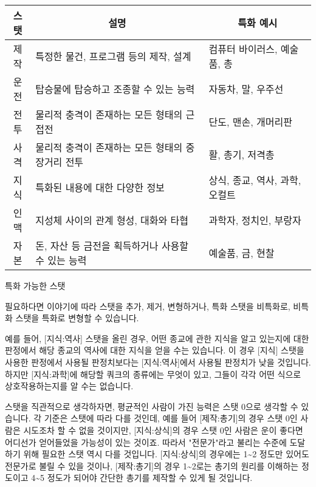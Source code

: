 \documentclass{report}
\begin{document}
	\begin{minipage}{\textwidth}
		\begin{tabularx}{\textwidth}{c|X|l}
			\hline
			\textbf{스탯} & \multicolumn{1}{c|}{\textbf{설명}} & \multicolumn{1}{c}{\textbf{특화 예시}} \\ \hline \hline
			제작          & 특정한 물건, 프로그램 등의 제작, 설계          & 컴퓨터 바이러스, 예술품, 총          \\\hline
			운전          & 탑승물에 탑승하고 조종할 수 있는 능력           & 자동차, 말, 우주선         \\\hline
			전투          & 물리적 충격이 존재하는 모든 형태의 근접전         & 단도, 맨손, 개머리판         \\\hline
			사격          & 물리적 충격이 존재하는 모든 형태의 중장거리 전투     & 활, 총기, 저격총         \\\hline
			지식          & 특화된 내용에 대한 다양한 정보               & 상식, 종교, 역사, 과학, 오컬트         \\\hline
			인맥          & 지성체 사이의 관계 형성, 대화와 타협           & 과학자, 정치인, 부랑자         \\\hline
			자본          & 돈, 자산 등 금전을 획득하거나 사용할 수 있는 능력   & 예술품, 금, 현찰  \\\hline
		\end{tabularx}
		
		\begin{center}
			특화 가능한 스탯
		\end{center}
	\end{minipage}
	
	\bigskip
	
	필요하다면 이야기에 따라 스탯을 추가, 제거, 변형하거나, 특화 스탯을 비특화로, 비특화 스탯을 특화로 변형할 수 있습니다.
	
	\bigskip
	
	예를 들어, [지식:역사] 스탯을 올린 경우, 어떤 종교에 관한 지식을 알고 있는지에 대한 판정에서 해당 종교의 역사에 대한 지식을 얻을 수는 있습니다. 이 경우 [지식] 스탯을 사용한 판정에서 사용될 판정치보다는 [지식:역사]에서 사용될 판정치가 낮을 것입니다. 하지만 [지식:과학]에 해당할 쿼크의 종류에는 무엇이 있고, 그들이 각각 어떤 식으로 상호작용하는지를 알 수는 없습니다.
	
	\bigskip
	
	스탯을 직관적으로 생각하자면, 평균적인 사람이 가진 능력은 스탯 0으로 생각할 수 있습니다. 각 기준은 스탯에 따라 다를 것인데, 예를 들어 [제작:총기]의 경우 스탯 0인 사람은 시도조차 할 수 없을 것이지만, [지식:상식]의 경우 스탯 0인 사람은 운이 좋다면 어디선가 얻어들었을 가능성이 있는 것이죠. 따라서 "전문가"라고 불리는 수준에 도달하기 위해 필요한 스탯 역시 다를 것입니다. [지식:상식]의 경우에는 1\textasciitilde2 정도만 있어도 전문가로 불릴 수 있을 것이나, [제작:총기]의 경우 1\textasciitilde2로는 총기의 원리를 이해하는 정도이고 4\textasciitilde5 정도가 되어야 간단한 총기를 제작할 수 있게 될 것입니다.
	
\end{document}
